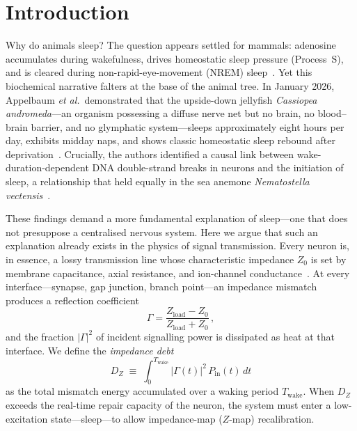 ﻿\documentclass[aps,pre,twocolumn,superscriptaddress,floatfix]{revtex4-2}
\begin{document}
\maketitle

\section{Introduction}

Why do animals sleep?
The question appears settled for mammals:
adenosine accumulates during wakefulness, drives homeostatic sleep
pressure (Process~S), and is cleared during non-rapid-eye-movement
(NREM) sleep~\cite{Porkka2011}.
Yet this biochemical narrative falters at the base of the animal tree.
In January 2026, Appelbaum \emph{et al.}\ demonstrated that
the upside-down jellyfish \textit{Cassiopea andromeda}---an organism
possessing a diffuse nerve net but no brain, no blood--brain barrier,
and no glymphatic system---sleeps approximately eight hours per day,
exhibits midday naps, and shows classic homeostatic sleep rebound
after deprivation~\cite{Appelbaum2026}.
Crucially, the authors identified a causal link between
wake-duration-dependent DNA double-strand breaks in neurons
and the initiation of sleep, a relationship that held equally
in the sea anemone \textit{Nematostella vectensis}~\cite{Appelbaum2026}.

These findings demand a more fundamental explanation of sleep---one
that does not presuppose a centralised nervous system.
Here we argue that such an explanation already exists in
the physics of signal transmission.
Every neuron is, in essence, a lossy transmission line
whose characteristic impedance $Z_0$ is set by membrane capacitance,
axial resistance, and ion-channel conductance~\cite{PaperI}.
At every interface---synapse, gap junction, branch point---an
impedance mismatch produces a reflection coefficient
\begin{equation}
  \Gamma = \frac{Z_{\mathrm{load}} - Z_0}{Z_{\mathrm{load}} + Z_0}\,,
  \label{eq:gamma}
\end{equation}
and the fraction $|\Gamma|^2$ of incident signalling power is
dissipated as heat at that interface.
We define the \emph{impedance debt}
\begin{equation}
  D_Z \;\equiv\; \int_0^{T_{\mathrm{wake}}}
    |\Gamma(t)|^2\, P_{\mathrm{in}}(t)\,dt
  \label{eq:DZ}
\end{equation}
as the total mismatch energy accumulated over a waking period
$T_{\mathrm{wake}}$.
When $D_Z$ exceeds the real-time repair capacity of the neuron,
the system must enter a low-excitation state---sleep---to allow
impedance-map ($Z$-map) recalibration.
\end{document}
